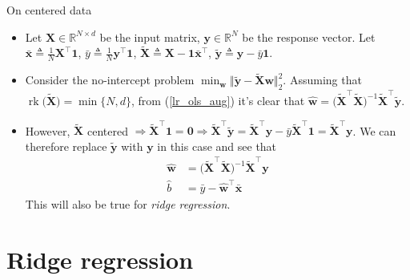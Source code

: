 \documentclass{beamer}
\numberwithin{equation}{section}
\newcommand{\aref}[1]{\alert{\ref{#1}}}
\begin{document}
\begin{frame}{On centered data}
    \begin{itemize}
        \item
        Let $ \mathbf{X} \in \mathbb{R}^{N \times d} $ be the input matrix,
        $ \mathbf{y} \in \mathbb{R}^N $ be the response vector. Let
        $ \bar{\mathbf{x}} \triangleq \frac{1}{N}\mathbf{X}^\top\mathbf{1} $,
        $ \bar{y} \triangleq \frac{1}{N}\mathbf{y}^\top\mathbf{1} $,
        $ \tilde{\mathbf{X}} \triangleq \mathbf{X} -
        \mathbf{1}\bar{\mathbf{x}}^\top $, $ \tilde{\mathbf{y}} \triangleq
        \mathbf{y} - \bar{y}\mathbf{1} $.

        \item
        Consider the no-intercept problem $ \min_{\mathbf{w}}\Vert
        \tilde{\mathbf{y}} - \tilde{\mathbf{X}}\mathbf{w}\Vert_2^2 $. Assuming
        that $ \operatorname{rk}\big(\tilde{\mathbf{X}}\big) = \min\{N, d\} $,
        from (\aref{lr_ols_aug}) it's clear that $ \hat{\mathbf{w}} = \big(
        \tilde{\mathbf{X}}^\top\tilde{\mathbf{X}}\big)^{-1}
        \tilde{\mathbf{X}}^\top\tilde{\mathbf{y}} $.

        \item
        However, $ \tilde{\mathbf{X}} $ centered $ \Rightarrow
        \tilde{\mathbf{X}}^\top\mathbf{1} = \mathbf{0} \Rightarrow
        \tilde{\mathbf{X}}^\top\tilde{\mathbf{y}} =
        \tilde{\mathbf{X}}^\top\mathbf{y} - \bar{y}
        \tilde{\mathbf{X}}^\top\mathbf{1} =
        \tilde{\mathbf{X}}^\top\mathbf{y} $. We can therefore replace
        $ \tilde{\mathbf{y}} $ with $ \mathbf{y} $ in this case and see that
        \begin{equation} \label{lr_ols_cent}
            \begin{split}
                \hat{\mathbf{w}} & = \big(
	                \tilde{\mathbf{X}}^\top\tilde{\mathbf{X}}
	            \big)^{-1}\tilde{\mathbf{X}}^\top\mathbf{y} \\
	            \hat{b} & = \bar{y} - \hat{\mathbf{w}}^\top\bar{\mathbf{x}}
            \end{split}
        \end{equation}
        This will also be true for \textit{ridge regression}.
    \end{itemize}
\end{frame}

\section{Ridge regression}
\end{document}
